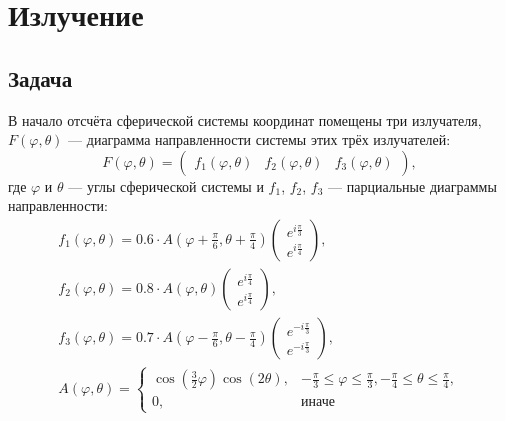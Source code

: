 \documentclass[a4paper,12pt]{article}
\begin{document}
\section{Излучение}

\subsection{Задача}

В начало отсчёта сферической системы координат помещены три излучателя, $F(\varphi, \theta)$ --- диаграмма направленности системы этих трёх излучателей:
\[
    F(\varphi, \theta)
    = \begin{pmatrix}
        f_1(\varphi, \theta) & f_2(\varphi, \theta) & f_3(\varphi, \theta)
    \end{pmatrix} ,
\]
где $\varphi$ и $\theta$ --- углы сферической системы и $f_1$, $f_2$, $f_3$ --- парциальные диаграммы направленности:
\begin{gather*}
    f_1(\varphi, \theta) =
    0.6 \cdot A \left( \varphi + \frac{\pi}{6}, \theta + \frac{\pi}{4} \right)
    \begin{pmatrix}
        e^{i \frac{\pi}{3}} \\
        e^{i \frac{\pi}{4}}
    \end{pmatrix}, \\
    f_2(\varphi, \theta) =
    0.8 \cdot A \left( \varphi, \theta \right)
    \begin{pmatrix}
        e^{i \frac{\pi}{4}} \\
        e^{i \frac{\pi}{4}}
    \end{pmatrix}, \\
    f_3(\varphi, \theta) =
    0.7 \cdot A \left( \varphi - \frac{\pi}{6}, \theta - \frac{\pi}{4} \right)
    \begin{pmatrix}
        e^{-i \frac{\pi}{3}} \\
        e^{-i \frac{\pi}{3}}
    \end{pmatrix} , \\
    A \left( \varphi, \theta \right)
    =
    \left \{
    \begin{array}{ll}
        \cos \left( \frac{3}{2} \varphi \right) \cos \left( 2 \theta \right), & -\frac{\pi}{3} \le \varphi \le \frac{\pi}{3}, -\frac{\pi}{4} \le \theta \le \frac{\pi}{4}, \\
        0,                                                                    & \text{иначе}
    \end{array}
    \right .
\end{gather*}
\end{document}
